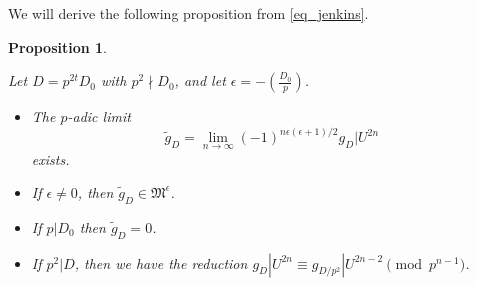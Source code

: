 \documentclass[11pt,letterpaper]{amsart}
\newcommand{\gM}{{\mathfrak M}}
\newtheorem{prop}{Proposition}
\theoremstyle{remark}
\begin{document}
We will derive the following proposition from \eqref{eq_jenkins}.

\begin{prop} \label{prop_lim_jenkins} 


Let $D=p^{2t}D_0$ with $p^2 \nmid D_0$, and
let $\epsilon = - \left( \frac{D_0}{p} \right)$.  

\begin{itemize}

\item[\normalfont(i)]
The $p$-adic limit 
\[
\tilde{g}_D = \lim_{n \rightarrow \infty} (-1)^{n\epsilon(\epsilon +1)/2}g_D|U^{2n} 
\]
exists.

\item[\normalfont(ii)]
If $\epsilon \neq 0$, then $\tilde{g}_D  \in \gM^\epsilon$.

\item[\normalfont(iii)]
If $p|D_0$ then $\tilde{g}_D = 0$.

\item[\normalfont(iv)]
If $p^2|D$,  then we have the reduction $g_D|U^{2n} \equiv g_{D/p^2}|U^{2n-2} \pmod {p^{n-1}}$.

\end{itemize}

\end{prop}
\end{document}
